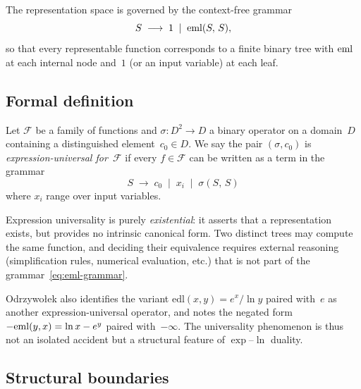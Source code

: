 The representation space is governed by the context-free grammar
\begin{equation}\label{eq:eml-grammar}
  S \;\longrightarrow\; 1 \;\mid\; \operatorname{eml}(S,\,S),
\end{equation}
so that every representable function corresponds to a finite binary
tree with $\operatorname{eml}$ at each internal node and~$1$ (or an input
variable) at each leaf.

\subsection{Formal definition}

\begin{definition}\label{def:expr-univ}
Let $\mathcal{F}$ be a family of functions and
$\sigma \colon D^{2} \to D$ a binary operator on a domain~$D$
containing a distinguished element~$c_0 \in D$.
We say the pair $(\sigma, c_0)$ is
\emph{expression-universal for~$\mathcal{F}$} if every $f \in
\mathcal{F}$ can be written as a term in the grammar
\[
  S \;\longrightarrow\; c_0 \;\mid\; x_i
    \;\mid\; \sigma(S,\,S)
\]
where $x_i$ range over input variables.
\end{definition}

\begin{remark}\label{rem:no-canon}
Expression universality is purely \emph{existential}:
it asserts that a representation exists, but provides no intrinsic
canonical form.  Two distinct trees may compute the same function,
and deciding their equivalence requires external reasoning
(simplification rules, numerical evaluation, etc.) that is not part
of the grammar~\eqref{eq:eml-grammar}.
\end{remark}

\begin{remark}\label{rem:eml-variants}
Odrzywołek also identifies the variant
$\mathrm{edl}(x,y) = e^{x}/\ln y$ paired with~$e$ as another
expression-universal operator, and notes the negated form
$-\!\operatorname{eml}(y,x) = \ln x - e^{y}$ paired with~$-\infty$.
The universality phenomenon is thus not an isolated accident but a
structural feature of $\exp$--$\ln$ duality.
\end{remark}

\subsection{Structural boundaries}

